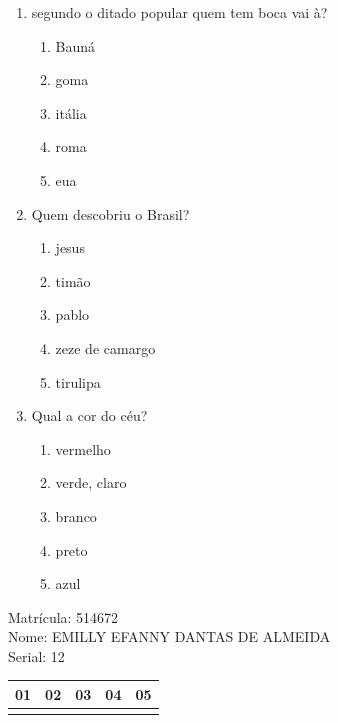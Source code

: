 \documentclass[10pt,a4paper,twocolumn]{report}
\begin{document}
 \begin{enumerate} 
    \item  segundo o ditado popular quem tem boca vai à?





    \begin{enumerate}
    \item  Bauná

\item  goma

\item  itália

\item  roma

\item  eua


    \end{enumerate} 
    \item  Quem descobriu o Brasil?





    \begin{enumerate}
    \item  jesus

\item  timão

\item  pablo

\item  zeze de camargo

\item  tirulipa


    \end{enumerate} 
    \item  Qual a cor do céu?





    \begin{enumerate}
    \item  vermelho

\item  verde, claro

\item  branco

\item  preto

\item  azul


    \end{enumerate}\end{enumerate} 
Matrícula: 514672\\ Nome: EMILLY EFANNY DANTAS DE ALMEIDA \\ Serial: 12\\
\begin{tabular}{|l|l|l|l|l|}\hline
01  &02  &03  &04  &05 \\ \hline 
 & & & & \\ \hline 
\end{tabular}
 \cleardoublepage 
\end{document}
